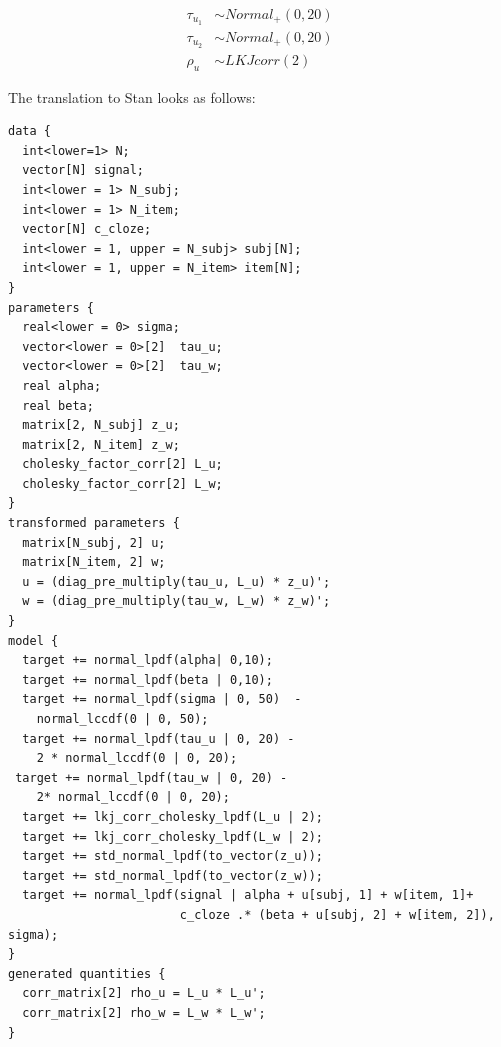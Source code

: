 \documentclass[12pt,]{krantz}
\newenvironment{Shaded}{\begin{snugshade}}{\end{snugshade}}
\newcommand{\DataTypeTok}[1]{\textcolor[rgb]{0.13,0.29,0.53}{#1}}
\newcommand{\KeywordTok}[1]{\textcolor[rgb]{0.13,0.29,0.53}{\textbf{#1}}}
\newcommand{\NormalTok}[1]{#1}
\newcommand{\OperatorTok}[1]{\textcolor[rgb]{0.81,0.36,0.00}{\textbf{#1}}}
\newcommand{\StringTok}[1]{\textcolor[rgb]{0.31,0.60,0.02}{#1}}
\theoremstyle{definition}
\theoremstyle{definition}
\theoremstyle{definition}
\theoremstyle{remark}
\begin{document}
\begin{equation}
\begin{aligned}
\tau_{u_1} &\sim Normal_+(0,20)\\
\tau_{u_2} &\sim Normal_+(0,20)\\
\rho_u &\sim LKJcorr(2) 
\end{aligned}
\end{equation}

The translation to Stan looks as follows:

\begin{verbatim}
data {
  int<lower=1> N;
  vector[N] signal;
  int<lower = 1> N_subj;
  int<lower = 1> N_item;
  vector[N] c_cloze;
  int<lower = 1, upper = N_subj> subj[N]; 
  int<lower = 1, upper = N_item> item[N]; 
}
parameters {
  real<lower = 0> sigma;
  vector<lower = 0>[2]  tau_u;   
  vector<lower = 0>[2]  tau_w;   
  real alpha;
  real beta;
  matrix[2, N_subj] z_u;
  matrix[2, N_item] z_w;
  cholesky_factor_corr[2] L_u;
  cholesky_factor_corr[2] L_w;
}
transformed parameters {
  matrix[N_subj, 2] u;
  matrix[N_item, 2] w;
  u = (diag_pre_multiply(tau_u, L_u) * z_u)';
  w = (diag_pre_multiply(tau_w, L_w) * z_w)';
}
model {
  target += normal_lpdf(alpha| 0,10);
  target += normal_lpdf(beta | 0,10);
  target += normal_lpdf(sigma | 0, 50)  -
    normal_lccdf(0 | 0, 50);
  target += normal_lpdf(tau_u | 0, 20) -
    2 * normal_lccdf(0 | 0, 20);
 target += normal_lpdf(tau_w | 0, 20) -
    2* normal_lccdf(0 | 0, 20);
  target += lkj_corr_cholesky_lpdf(L_u | 2);
  target += lkj_corr_cholesky_lpdf(L_w | 2);
  target += std_normal_lpdf(to_vector(z_u));
  target += std_normal_lpdf(to_vector(z_w));
  target += normal_lpdf(signal | alpha + u[subj, 1] + w[item, 1]+
                        c_cloze .* (beta + u[subj, 2] + w[item, 2]), sigma);
}
generated quantities {
  corr_matrix[2] rho_u = L_u * L_u';
  corr_matrix[2] rho_w = L_w * L_w';
}
\end{verbatim}

\begin{Shaded}
\end{Shaded}
\end{document}
